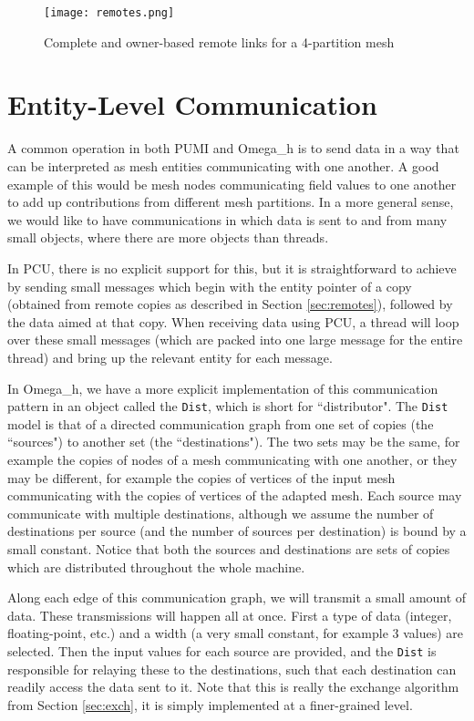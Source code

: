 \begin{figure}[t]\vspace*{4pt}
\centerline{\texttt{[image: remotes.png]}}
\caption{Complete and owner-based remote links for a
4-partition mesh}\vspace*{-6pt}
\label{fig:remotes}
\end{figure}

\section{Entity-Level Communication}
\label{sec:dist}

A common operation in both PUMI and Omega\_h is to send
data in a way that can be interpreted as mesh entities
communicating with one another.
A good example of this would be mesh nodes communicating
field values to one another to add up contributions from
different mesh partitions.
In a more general sense, we would like to have communications
in which data is sent to and from many small objects,
where there are more objects than threads.

In PCU, there is no explicit support for this, but it
is straightforward to achieve by sending small messages
which begin with the entity pointer of a copy (obtained from remote
copies as described in Section \ref{sec:remotes}),
followed by the data aimed at that copy.
When receiving data using PCU, a thread will loop over these
small messages (which are packed into one large message
for the entire thread) and bring up the relevant entity for each message.

In Omega\_h, we have a more explicit implementation of
this communication pattern in an object called the \texttt{Dist},
which is short for ``distributor".
The \texttt{Dist} model is that of a directed communication graph from one set of
copies (the ``sources") to another set (the ``destinations").
The two sets may be the same, for example the copies of nodes of a
mesh communicating with one another, or they may be different, for example
the copies of vertices of the input mesh communicating with
the copies of vertices of the adapted mesh.
Each source may communicate with multiple destinations, although we
assume the number of destinations per source (and the number of sources
per destination) is bound by a small constant.
Notice that both the sources and destinations are sets of copies which
are distributed throughout the whole machine.

Along each edge of this communication graph, we will transmit
a small amount of data.
These transmissions will happen all at once.
First a type of data (integer, floating-point, etc.) and a width
(a very small constant, for example 3 values) are selected.
Then the input values for each source are provided, and the
\texttt{Dist} is responsible for relaying these to
the destinations, such that each destination can readily access
the data sent to it.
Note that this is really the exchange algorithm from
Section \ref{sec:exch}, it is simply implemented at a finer-grained level.


